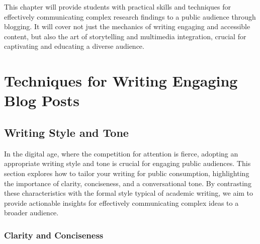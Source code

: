 \documentclass[
]{book}
\begin{document}
This chapter will provide students with practical skills and techniques for effectively communicating complex research findings to a public audience through blogging. It will cover not just the mechanics of writing engaging and accessible content, but also the art of storytelling and multimedia integration, crucial for captivating and educating a diverse audience.

\hypertarget{techniques-for-writing-engaging-blog-posts}{%
\section*{Techniques for Writing Engaging Blog Posts}\label{techniques-for-writing-engaging-blog-posts}}

\hypertarget{writing-style-and-tone}{%
\subsection*{Writing Style and Tone}\label{writing-style-and-tone}}

In the digital age, where the competition for attention is fierce, adopting an appropriate writing style and tone is crucial for engaging public audiences. This section explores how to tailor your writing for public consumption, highlighting the importance of clarity, conciseness, and a conversational tone. By contrasting these characteristics with the formal style typical of academic writing, we aim to provide actionable insights for effectively communicating complex ideas to a broader audience.

\hypertarget{clarity-and-conciseness}{%
\subsubsection*{Clarity and Conciseness}\label{clarity-and-conciseness}}
\end{document}
